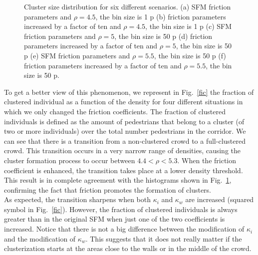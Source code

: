 \documentclass[preprint,12pt]{elsarticle}
\begin{document}
\begin{figure}[!htbp]
\caption[width=0.47\columnwidth]{Cluster size distribution for six different scenarios. (a) SFM friction parameters and $\rho=4.5$, the bin size is 1 p (b) friction parameters increased by a factor of ten and $\rho=4.5$, the bin size is 1 p (c) SFM friction parameters and $\rho=5$, the bin size is 50 p (d) friction parameters increased by a factor of ten and $\rho=5$, the bin size is 50 p (e) SFM friction parameters and $\rho=5.5$, the bin size is 50 p (f) friction parameters increased by a factor of ten and $\rho=5.5$, the bin size is 50 p.}
\label{cluster_distribution}
\end{figure}

To get a better view of this phenomenon, we represent in Fig.~\ref{fic} the fraction of clustered individual as a function of the density for four different situations in which we only changed the friction coefficients. The fraction of clustered individuals is defined as the amount of pedestrians that belong to a cluster (of two or more individuals) over the total number pedestrians in the corridor. 
We can see that there is a transition from a non-clustered crowd to a full-clustered crowd. This transition occurs in a very narrow range of densities, causing the cluster formation process to occur between $4.4<\rho<5.3$. When the friction coefficient is enhanced, the transition takes place at a lower density threshold. This result is in complete agreement with the histograms shown in Fig.~\ref{cluster_distribution}, confirming the fact that friction promotes the formation of clusters.\\

As expected, the transition sharpens when both $\kappa_i$ and $\kappa_w$ are increased (squared symbol in Fig.~\ref{fic}). However, the fraction of clustered individuals is always greater than in the original SFM when just one of the
two coefficients is increased. Notice that there is not a big difference between the modification of $\kappa_i$ and the modification of $\kappa_w$. This suggests that it does not really matter if the clusterization starts at the areas close to the walls or in the middle of the crowd.\\
\end{document}
